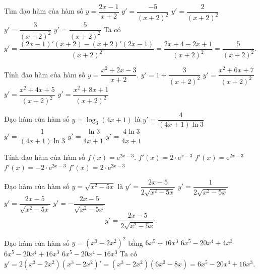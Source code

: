 \begin{ex}
	Tìm đạo hàm của hàm số $y=\dfrac{2x-1}{x+2}$
	\choice
	{$y'=\dfrac{-5}{(x+2)^2}$}
	{$y'=\dfrac{2}{(x+2)^2}$}
	{$y'=\dfrac{3}{(x+2)^2}$}
	{\True $y'=\dfrac{5}{(x+2)^2}$}
	\loigiai
	{
		Ta có $y'=\dfrac{(2x-1)'(x+2)-(x+2)'(2x-1)}{(x+2)^2}=\dfrac{2x+4-2x+1}{(x+2)^2}=\dfrac{5}{(x+2)^2}.$
	}
\end{ex}

\begin{ex}%
	Tính đạo hàm của hàm số $y=\dfrac{x^2+2x-3}{x+2}.$
	\choice
	{\True  $y'=1+\dfrac{3}{(x+2)^2}$}
	{$y'=\dfrac{x^2+6x+7}{(x+2)^2}$}
	{$y'=\dfrac{x^2+4x+5}{(x+2)^2}$}
	{$y'=\dfrac{x^2+8x+1}{(x+2)^2}$} 
\end{ex}

\begin{ex}
	Đạo hàm của hàm số $y = \log_3 (4x + 1)$ là
	\choice
	{\True $y' = \dfrac{4}{(4x + 1)\ln 3}$}
	{$y' = \dfrac{1}{(4x + 1) \ln 3}$}
	{$y' = \dfrac{\ln 3}{4x + 1}$}
	{$y' = \dfrac{4 \ln 3}{4x + 1}$}
\end{ex}

\begin{ex}
	Tính đạo hàm của hàm số $f(x)=\mathrm{e}^{2x-3}$.
	\choice
	{$f'(x)=2\cdot\mathrm{e}^{x-3}$}
	{$f'(x)=\mathrm{e}^{2x-3}$}
	{$f'(x)=-2\cdot\mathrm{e}^{2x-3}$}
	{\True $f'(x)=2\cdot\mathrm{e}^{2x-3}$}
\end{ex}

\begin{ex}%
	Đạo hàm của hàm số $y=\sqrt{x^2-5x}$ là
	\choice
	{\True $y'=\dfrac{2x-5}{2\sqrt{x^2-5x}}$}
	{$y'=\dfrac{1}{2\sqrt{x^2-5x}}$}
	{$y'=\dfrac{2x-5}{\sqrt{x^2-5x}}$}
	{$y'=-\dfrac{2x-5}{\sqrt{x^2-5x}}$}
	\loigiai
	{
		$$y'=\dfrac{2x-5}{2\sqrt{x^2-5x}}. $$
	}
\end{ex}

\begin{ex}
	Đạo hàm của hàm số $y=\left(x^3-2x^2\right)^2$ bằng
	\choice
	{$6x^5+16x^3$}
	{$6x^5-20x^4+4x^3$}
	{\True $6x^5-20x^4+16x^3$}
	{$6x^5-20x^4-16x^3$}
	\loigiai
	{
		Ta có $y'=2\left(x^3-2x^2\right)\left(x^3-2x^2 \right)'=\left(x^3-2x^2\right)\left(6x^2-8x\right)=6x^5-20x^4+16x^3$.
	}
\end{ex}

